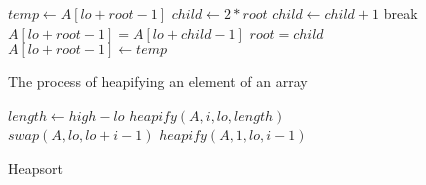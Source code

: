\documentclass{article}
\begin{document}
\begin{figure}
\begin{algorithmic}[1]
		\State $temp \gets A[lo + root - 1]$
			\State $child \gets 2 * root$
				\State $child \gets child + 1$ 
			\EndIf
				\State break 
			\EndIf
			\State $A[lo + root - 1] = A[lo + child - 1]$
			\State $root = child$ 
		\EndWhile
		\State $A[lo + root - 1] \gets temp$
	\EndProcedure
\end{algorithmic}
\caption{The process of heapifying an element of an array}
\label{heapify}
\end{figure}

\begin{figure}
\begin{algorithmic}[1]
		\State $length \gets high - lo$
			\State $heapify(A, i, lo, length)$
		\EndFor
			\State $swap(A, lo, lo + i - 1)$
			\State $heapify(A, 1, lo, i-1)$
		\EndFor
	\EndProcedure
\end{algorithmic}
\caption{Heapsort}
\label{heapsort}
\end{figure}
\end{document}
